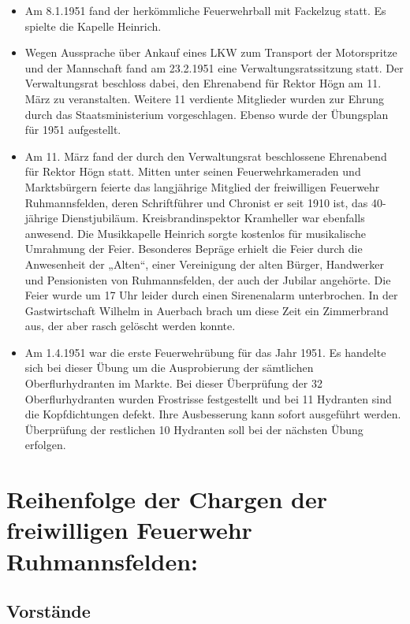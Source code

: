 \documentclass[12pt,a4paper]{book}
\begin{document}
\begin{itemize}
\item Am 8.1.1951 fand der herkömmliche Feuerwehrball mit Fackelzug
statt. Es spielte die Kapelle Heinrich.

\item Wegen Aussprache über Ankauf eines LKW zum Transport der
Motorspritze und der Mannschaft fand am 23.2.1951 eine
Verwaltungsratssitzung statt. Der Verwaltungsrat beschloss dabei, den
Ehrenabend für Rektor Högn am 11. März zu veranstalten. Weitere 11
verdiente Mitglieder wurden zur Ehrung durch das Staatsministerium
vorgeschlagen. Ebenso wurde der Übungsplan für 1951 aufgestellt.

\item Am 11. März fand der durch den Verwaltungsrat beschlossene
Ehrenabend für Rektor Högn statt. Mitten unter seinen Feuerwehrkameraden
und Marktsbürgern feierte das langjährige Mitglied der freiwilligen
Feuerwehr Ruhmannsfelden, deren Schriftführer und Chronist er seit 1910
ist, das 40-jährige Dienstjubiläum. Kreisbrandinspektor Kramheller war
ebenfalls anwesend. Die Musikkapelle Heinrich sorgte kostenlos für
musikalische Umrahmung der Feier. Besonderes Bepräge erhielt die Feier
durch die Anwesenheit der „Alten“, einer Vereinigung der alten Bürger,
Handwerker und Pensionisten von Ruhmannsfelden, der auch der Jubilar
angehörte. Die Feier wurde um 17 Uhr leider durch einen Sirenenalarm
unterbrochen. In der Gastwirtschaft Wilhelm in Auerbach brach um diese
Zeit ein Zimmerbrand aus, der aber rasch gelöscht werden konnte.

\item Am 1.4.1951 war die erste Feuerwehrübung für das Jahr 1951. Es
handelte sich bei dieser Übung um die Ausprobierung der sämtlichen
Oberflurhydranten im Markte. Bei dieser Überprüfung der 32
Oberflurhydranten wurden Frostrisse festgestellt und bei 11 Hydranten
sind die Kopfdichtungen defekt. Ihre Ausbesserung kann sofort ausgeführt
werden. Überprüfung der restlichen 10 Hydranten soll bei der nächsten
Übung erfolgen.
\end{itemize}

\chapter[Reihenfolge der Chargen]{Reihenfolge der Chargen der
freiwilligen Feuerwehr Ruhmannsfelden:}

\section*{Vorstände}
\end{document}
